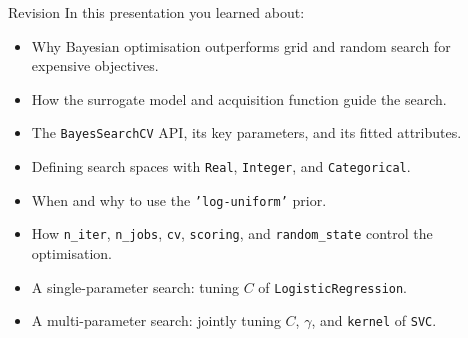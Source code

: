 \documentclass{beamer}
\begin{document}
\begin{frame}{Revision}
  In this presentation you learned about:
  \begin{itemize}
    \item Why Bayesian optimisation outperforms grid and random search for expensive objectives.
    \item How the surrogate model and acquisition function guide the search.
    \item The \texttt{BayesSearchCV} API, its key parameters, and its fitted attributes.
    \item Defining search spaces with \texttt{Real}, \texttt{Integer}, and \texttt{Categorical}.
    \item When and why to use the \texttt{'log-uniform'} prior.
    \item How \texttt{n\_iter}, \texttt{n\_jobs}, \texttt{cv}, \texttt{scoring}, and \texttt{random\_state} control the optimisation.
    \item A single-parameter search: tuning \(C\) of \texttt{LogisticRegression}.
    \item A multi-parameter search: jointly tuning \(C\), \(\gamma\), and \texttt{kernel} of \texttt{SVC}.
  \end{itemize}
\end{frame}
\end{document}
